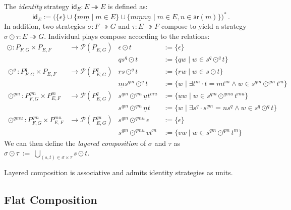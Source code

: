\documentclass[acmsmall,screen,review,anonymous,nonacm]{acmart}
\newcommand{\kw}[1]{\ensuremath{ \mathsf{#1} }}
\begin{document}
\begin{definition} %
The \emph{identity} strategy $\kw{id}_E : E \twoheadrightarrow E$
is defined as:
\[
  \kw{id}_E :=
    \bigl(
      \{\epsilon\} \cup 
      \{ m \underline{m} \mid m \in E \} \cup
      \{ m \underline{m} n \underline{n} \mid m \in E, n \in \kw{ar}(m) \}
    \bigr)^*
  \,.
\]
In addition, two strategies
$\sigma : F \twoheadrightarrow G$ and
$\tau : E \twoheadrightarrow F$
compose to yield a strategy
$\sigma \odot \tau : E \twoheadrightarrow G$.
Individual plays compose
according to the relations:
\begin{align*}
  {\odot} : P_{F,G} \times P_{E,F}
    &\rightarrow \mathcal{P}(P_{E,G}) &
  \epsilon \odot t &:= \{ \epsilon \} \\&&
  qs^q \odot t &:= \{ qw \mid w \in s^q \odot^q t \}
  \\
  {\odot}^q : P_{F,G}^q \times P_{E,F}
    &\rightarrow \mathcal{P}(P_{E,G}^q) &
  \underline{r} s \odot^q t &:=
    \{ \underline{r} w \mid w \in s \odot t \} \\&&
  \underline{m} s^{qm} \odot^q t &:=
    \{ w \mid \exists t^m \cdot t = mt^m \wedge w \in s^{qm} \odot^{qm} t^m \}
  \\
  {\odot}^{qm} : P_{F,G}^{qm} \times P_{E,F}^m
    &\rightarrow \mathcal{P}(P_{E,G}^q) &
  s^{qm} \odot^{qm} \underline{u} t^{mu} &:=
    \{ \underline{u} w \mid w \in s^{qm} \odot^{qmu} t^{mu} \} \\&&
  s^{qm} \odot^{qm} \underline{n} t &:=
    \{ w \mid \exists s^q \cdot s^{qm} = ns^q \wedge w \in s^q \odot^q t \}
  \\
  {\odot}^{qmu} : P_{F,G}^{qm} \times P_{E,F}^{mu}
    &\rightarrow \mathcal{P}(P_{E,G}^{qu}) &
  s^{qm} \odot^{qmu} \epsilon &:= \{ \epsilon \} \\&&
  s^{qm} \odot^{qmu} v t^m &:= \{ v w \mid w \in s^{qm} \odot^{qm} t^m \}
\end{align*}
We can then define the \emph{layered composition} of $\sigma$ and $\tau$ as
$
  \sigma \odot \tau \: := \:
    \bigcup_{(s,t) \in \sigma \times \tau}
      s \odot t
$.
\end{definition}

\begin{theorem}
Layered composition is associative
and admits identity strategies as units.
\end{theorem}


\subsection{Flat Composition} %
\end{document}
